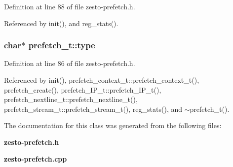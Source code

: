 Definition at line 88 of file zesto-prefetch.h.

Referenced by init(), and reg\_\-stats().
\subsubsection[{type}]{\setlength{\rightskip}{0pt plus 5cm}char$\ast$ {\bf prefetch\_\-t::type}\hspace{0.3cm}{\tt  [protected]}}\label{classprefetch__t_bc4f84c961bf88646104ac47716ca693}




Definition at line 86 of file zesto-prefetch.h.

Referenced by init(), prefetch\_\-context\_\-t::prefetch\_\-context\_\-t(), prefetch\_\-create(), prefetch\_\-IP\_\-t::prefetch\_\-IP\_\-t(), prefetch\_\-nextline\_\-t::prefetch\_\-nextline\_\-t(), prefetch\_\-stream\_\-t::prefetch\_\-stream\_\-t(), reg\_\-stats(), and $\sim$prefetch\_\-t().

The documentation for this class was generated from the following files:\begin{CompactItemize}
\item 
{\bf zesto-prefetch.h}\item 
{\bf zesto-prefetch.cpp}\end{CompactItemize}
